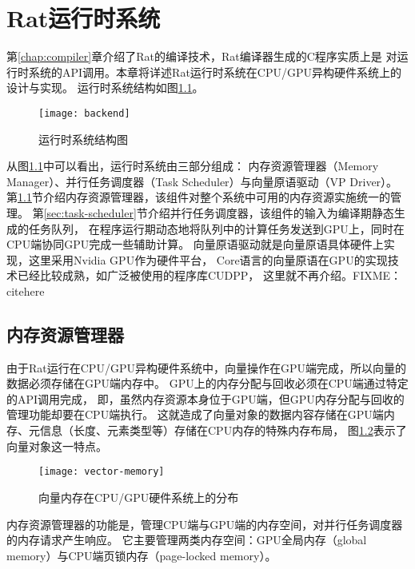 \chapter{Rat运行时系统}
第\ref{chap:compiler}章介绍了Rat的编译技术，Rat编译器生成的C程序实质上是
对运行时系统的API调用。本章将详述Rat运行时系统在CPU/GPU异构硬件系统上的设计与实现。
运行时系统结构如图\ref{fig:backend}。
\begin{figure}
  \centering
  \texttt{[image: backend]}
  \caption{运行时系统结构图}
  \label{fig:backend}
\end{figure}

从图\ref{fig:backend}中可以看出，运行时系统由三部分组成：
内存资源管理器（Memory Manager）、并行任务调度器（Task Scheduler）与向量原语驱动（VP Driver）。
第\ref{sec:memory-manager}节介绍内存资源管理器，该组件对整个系统中可用的内存资源实施统一的管理。
第\ref{sec:task-scheduler}节介绍并行任务调度器，该组件的输入为编译期静态生成的任务队列，
在程序运行期动态地将队列中的计算任务发送到GPU上，同时在CPU端协同GPU完成一些辅助计算。
向量原语驱动就是向量原语具体硬件上实现，这里采用Nvidia GPU作为硬件平台，
Core语言的向量原语在GPU的实现技术已经比较成熟，如广泛被使用的程序库CUDPP，
这里就不再介绍。FIXME：citehere

\section{内存资源管理器}\label{sec:memory-manager}
由于Rat运行在CPU/GPU异构硬件系统中，向量操作在GPU端完成，所以向量的数据必须存储在GPU端内存中。
GPU上的内存分配与回收必须在CPU端通过特定的API调用完成，
即，虽然内存资源本身位于GPU端，但GPU内存分配与回收的管理功能却要在CPU端执行。
这就造成了向量对象的数据内容存储在GPU端内存、元信息（长度、元素类型等）存储在CPU内存的特殊内存布局，
图\ref{fig:vector-memory}表示了向量对象这一特点。
\begin{figure}
  \centering
  \texttt{[image: vector-memory]}
  \caption[向量内存分布]{向量内存在CPU/GPU硬件系统上的分布}
  \label{fig:vector-memory}
\end{figure}

内存资源管理器的功能是，管理CPU端与GPU端的内存空间，对并行任务调度器的内存请求产生响应。
它主要管理两类内存空间：GPU全局内存（global memory）与CPU端页锁内存（page-locked memory）。

